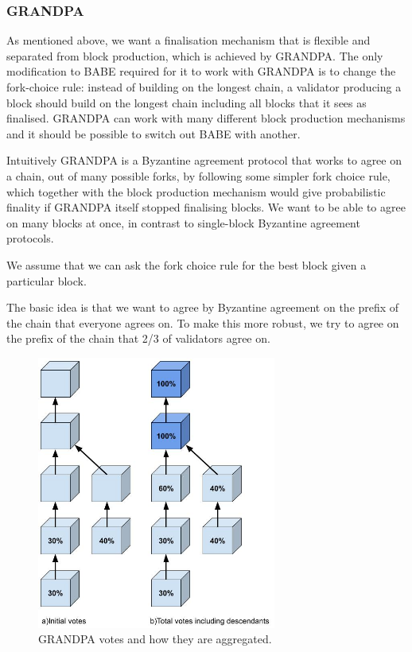 \subsubsection{GRANDPA} \label{sec:grandpa}


As mentioned above, we want a finalisation mechanism that is flexible and separated from block production, which is achieved by GRANDPA. The only modification to BABE required for it to work with GRANDPA is to change the fork-choice rule: instead of building on the longest chain, a validator producing a block should build on the longest chain including all blocks that it sees as finalised. GRANDPA can work with many different block production mechanisms and it should be possible to switch out BABE with another.

Intuitively GRANDPA is a Byzantine agreement protocol that works to agree on a chain, out of many possible forks, by following some simpler fork choice rule, which together with the block production mechanism would give probabilistic finality if GRANDPA itself stopped finalising blocks. We want to be able to agree on many blocks at once, in contrast to single-block Byzantine agreement protocols.

We assume that we can ask the fork choice rule for the best block given a particular block. 

The basic idea is that we want to agree by Byzantine agreement on the prefix of the chain that everyone agrees on. To make this more robust, we try to agree on the prefix of the chain that 2/3 of validators agree on.

\begin{figure}[h!]
  \centering
  \includegraphics[width=0.7\textwidth]{images/Grandpa.jpg}
  \caption{GRANDPA votes and how they are aggregated.}
    \label{fig:grandpa}
\end{figure}


